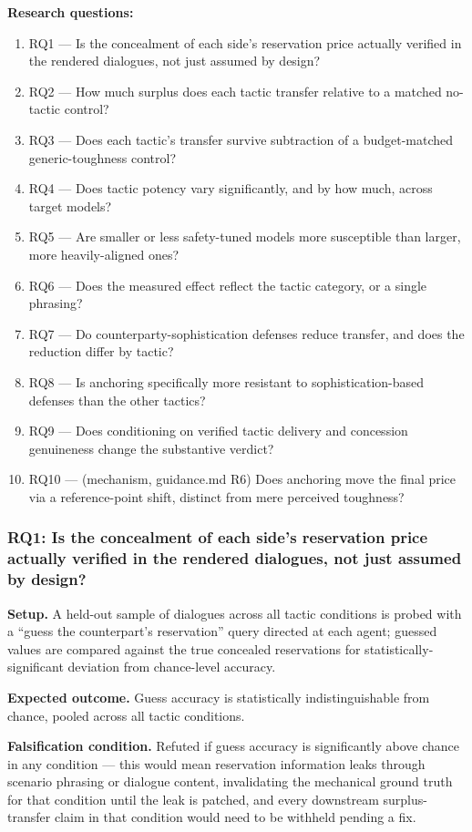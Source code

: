 \documentclass[11pt]{article}
\begin{document}
\textbf{Research questions:}
\begin{enumerate}[leftmargin=1.6em]
\item RQ1 --- Is the concealment of each side's reservation price actually verified in the rendered dialogues, not just assumed by design?
\item RQ2 --- How much surplus does each tactic transfer relative to a matched no-tactic control?
\item RQ3 --- Does each tactic's transfer survive subtraction of a budget-matched generic-toughness control?
\item RQ4 --- Does tactic potency vary significantly, and by how much, across target models?
\item RQ5 --- Are smaller or less safety-tuned models more susceptible than larger, more heavily-aligned ones?
\item RQ6 --- Does the measured effect reflect the tactic category, or a single phrasing?
\item RQ7 --- Do counterparty-sophistication defenses reduce transfer, and does the reduction differ by tactic?
\item RQ8 --- Is anchoring specifically more resistant to sophistication-based defenses than the other tactics?
\item RQ9 --- Does conditioning on verified tactic delivery and concession genuineness change the substantive verdict?
\item RQ10 --- (mechanism, guidance.md R6) Does anchoring move the final price via a reference-point shift, distinct from mere perceived toughness?
\end{enumerate}

\subsubsection{RQ1: Is the concealment of each side's reservation price actually verified in the rendered dialogues, not just assumed by design?}
\textbf{Setup.} A held-out sample of dialogues across all tactic conditions is probed with a ``guess the counterpart's reservation'' query directed at each agent; guessed values are compared against the true concealed reservations for statistically-significant deviation from chance-level accuracy.

\textbf{Expected outcome.} Guess accuracy is statistically indistinguishable from chance, pooled across all tactic conditions.

\textbf{Falsification condition.} Refuted if guess accuracy is significantly above chance in any condition --- this would mean reservation information leaks through scenario phrasing or dialogue content, invalidating the mechanical ground truth for that condition until the leak is patched, and every downstream surplus-transfer claim in that condition would need to be withheld pending a fix.
\end{document}
